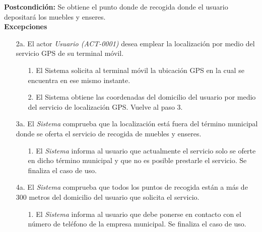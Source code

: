 \textbf{Postcondición: } 
 Se obtiene el punto donde de recogida donde el usuario depositará los muebles y enseres.\\

\textbf{Excepciones} 
\begin{enumerate}
	\item[2a.] El actor \textit{Usuario (ACT-0001)} desea emplear la localización por medio del servicio GPS de su terminal móvil.
	\begin{enumerate}
		\item[1.] El Sistema solicita al terminal móvil la ubicación GPS en la cual se encuentra en ese mismo instante.
		\item[2.] El Sistema obtiene las coordenadas del domicilio del usuario por medio del servicio de localización GPS. Vuelve al paso 3.
	\end{enumerate}
	\item[3a.] El \textit{Sistema} comprueba que la localización está fuera del término municipal donde se oferta el servicio de recogida de muebles y enseres.
	\begin{enumerate}
		\item[1.] El \textit{Sistema} informa al usuario que actualmente el servicio solo se oferte en dicho término municipal y que no es posible prestarle el servicio. Se finaliza el caso de uso.
	\end{enumerate}
	\item[4a.] El \textit{Sistema} comprueba que todos los puntos de recogida están a más de 300 metros del domicilio del usuario que solicita el servicio.
	\begin{enumerate}
		\item[1.] El \textit{Sistema} informa al usuario que debe ponerse en contacto con el número de teléfono de la empresa municipal. Se finaliza el caso de uso.
	\end{enumerate} 	
\end{enumerate} 
